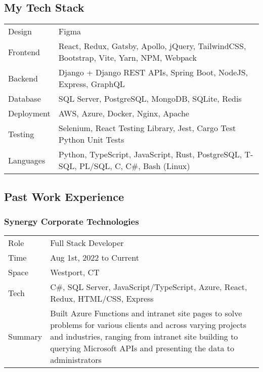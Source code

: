 \documentclass[letterpaper]{article}
\begin{document}
\hypertarget{my-tech-stack}{%
\subsection{My Tech Stack}\label{my-tech-stack}}

\begin{longtable}[]{@{}
  >{\raggedright\arraybackslash}p{}
  >{\raggedright\arraybackslash}p{}@{}}
\toprule\noalign{}
\endhead
\bottomrule\noalign{}
\endlastfoot
Design & Figma \\
Frontend & React, Redux, Gatsby, Apollo, jQuery, TailwindCSS, Bootstrap,
Vite, Yarn, NPM, Webpack \\
Backend & Django + Django REST APIs, Spring Boot, NodeJS, Express,
GraphQL \\
Database & SQL Server, PostgreSQL, MongoDB, SQLite, Redis \\
Deployment & AWS, Azure, Docker, Nginx, Apache \\
Testing & Selenium, React Testing Library, Jest, Cargo Test Python Unit
Tests \\
Languages & Python, TypeScript, JavaScript, Rust, PostgreSQL, T-SQL,
PL/SQL, C, C\#, Bash (Linux) \\
\end{longtable}

\hypertarget{past-work-experience}{%
\subsection{Past Work Experience}\label{past-work-experience}}

\hypertarget{synergy-corporate-technologies}{%
\subsubsection{Synergy Corporate
Technologies}\label{synergy-corporate-technologies}}

\begin{longtable}[]{@{}
  >{\raggedright\arraybackslash}p{}
  >{\raggedright\arraybackslash}p{}@{}}
\toprule\noalign{}
\endhead
\bottomrule\noalign{}
\endlastfoot
Role & Full Stack Developer \\
Time & Aug 1st, 2022 to Current \\
Space & Westport, CT \\
Tech & C\#, SQL Server, JavaScript/TypeScript, Azure, React, Redux,
HTML/CSS, Express \\
Summary & Built Azure Functions and intranet site pages to solve
problems for various clients and across varying projects and industries,
ranging from intranet site building to querying Microsoft APIs and
presenting the data to administrators \\
\end{longtable}
\end{document}
